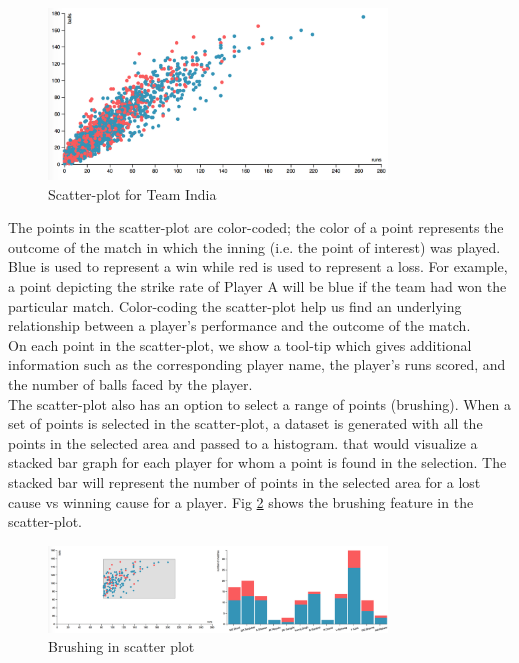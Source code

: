 \documentclass[10pt,journal,compsoc]{IEEEtran}
\begin{document}
\begin{figure}[ht]
\includegraphics[width=9cm]{scatter_plot.png}
\caption{Scatter-plot for Team India}
\label{fig:scatter_plot}
\end{figure}

\indent The points in the scatter-plot are color-coded; the color of a point represents the outcome of the match in which the inning (i.e. the point of interest) was played. Blue is used to represent a win while red is used to represent a loss. For example, a point depicting the strike rate of Player A will be blue if the team had won the particular match. Color-coding the scatter-plot help us find an underlying relationship between a player’s performance and the outcome of the match.\\

\indent On each point in the scatter-plot, we show a tool-tip which gives additional information such as the corresponding player name, the player’s runs scored, and the number of balls faced by the player.\\

\indent The scatter-plot also has an option to select a range of points (brushing). When a set of points is selected in the scatter-plot, a dataset is generated with all the points in the selected area and passed to a histogram. that would visualize a stacked bar graph for each player for whom a point is found in the selection. The stacked bar will represent the number of points in the selected area for a lost cause vs winning cause for a player. Fig \ref{fig:scatter_plot_brushing} shows the brushing feature in the scatter-plot.

\begin{figure}[ht]
\includegraphics[width=9cm]{scatter_plot_brushing.png}
\caption{Brushing in scatter plot}
\label{fig:scatter_plot_brushing}
\end{figure}
\end{document}
